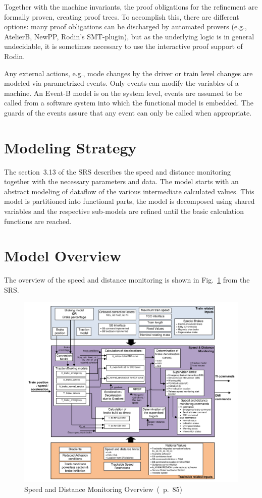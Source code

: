 \documentclass{template/openetcs_article}
\begin{document}
Together with the machine invariants, the proof obligations for the refinement
are formally proven, creating proof trees. To accomplish this, there are
different options: many proof obligations can be discharged by automated provers
(e.g., AtelierB, NewPP, Rodin's SMT-plugin), but as the underlying logic is in
general undecidable, it is sometimes necessary to use the interactive proof
support of Rodin.

Any external actions, e.g., mode changes by the driver or train level changes
are modeled via parametrized events. Only events can modify the variables of a
machine. An Event-B model is on the system level, events are assumed to be
called from a software system into which the functional model is embedded. The
guards of the events assure that any event can only be called when appropriate.

\section{Modeling Strategy}
\label{sec:modeling-strategy}

The section~3.13 of the SRS describes the speed and distance monitoring together
with the necessary parameters and data. The model starts with an abstract
modeling of dataflow of the various intermediate calculated values. This model
is partitioned into functional parts, the model is decomposed using shared
variables and the respective sub-models are refined until the basic calculation
functions are reached.

\section{Model Overview}
\label{sec:model-overview}

The overview of the speed and distance monitoring is shown in
Fig.~\ref{fig:speed-distance-system} from the SRS.

\begin{figure}[ht]
  \centering
  \includegraphics[width=.9\textwidth]{Overview_13_3}
  \caption{Speed and Distance Monitoring Overview~(\cite{SRS-026-330}~p.~85)}
  \label{fig:speed-distance-system}
\end{figure}
\end{document}
